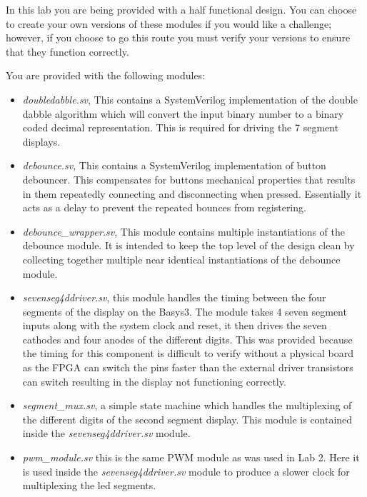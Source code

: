 In this lab you are being provided with a half functional design. You can choose to create your own versions of these modules if you would like a challenge; however, if you choose to go this route you must verify your versions to ensure that they function correctly.

You are provided with the following modules:
\begin{itemize}
    \item \textit{doubledabble.sv}, This contains a SystemVerilog implementation of the double dabble algorithm which will convert the input binary number to a binary coded decimal representation. This is required for driving the 7 segment displays. 
    
    \item \textit{debounce.sv}, This contains a SystemVerilog implementation of button debouncer. This compensates for buttons mechanical properties that results in them repeatedly connecting and disconnecting when pressed. Essentially it acts as a delay to prevent the repeated bounces from registering.

    \item \textit{debounce\_wrapper.sv}, This module contains multiple instantiations of the debounce module. It is intended to keep the top level of the design clean by collecting together multiple near identical instantiations of the debounce module. 
    
    \item \textit{sevenseg4ddriver.sv}, this module handles the timing between the four segments of the display on the Basys3. The module takes 4 seven segment inputs along with the system clock and reset, it then drives the seven cathodes and four anodes of the different digits. This was provided because the timing for this component is difficult to verify without a physical board as the FPGA can switch the pins faster than the external driver transistors can switch resulting in the display not functioning correctly.
    
    \item \textit{segment\_mux.sv}, a simple state machine which handles the multiplexing of the different digits of the second segment display. This module is contained inside the \textit{sevenseg4ddriver.sv} module.
    
    \item \textit{pwm\_module.sv} this is the same PWM module as was used in Lab 2. Here it is used inside the \textit{sevenseg4ddriver.sv} module to produce a slower clock for multiplexing the led segments. 
    

\end{itemize}
